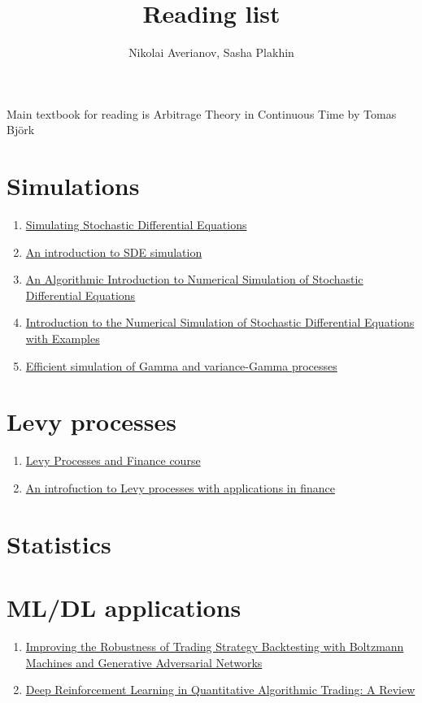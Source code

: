 \documentclass[a4paper, 12pt]{article}
\author{Nikolai Averianov, Sasha Plakhin}
\title{Reading list}
\begin{document}
\maketitle

Main textbook for reading is 
Arbitrage Theory in Continuous Time by Tomas Björk
\section*{Simulations}
\begin{enumerate}
	\item \href{http://www.columbia.edu/~mh2078/MonteCarlo/MCS_SDEs.pdf}{Simulating Stochastic Differential Equations}
	
	\item \href{https://arxiv.org/pdf/1004.0646.pdf}{An introduction to SDE simulation}
	
	\item \href{https://epubs.siam.org/doi/pdf/10.1137/S0036144500378302}{An Algorithmic Introduction to Numerical Simulation of Stochastic Differential Equations}
	
	\item \href{http://www.cs.fsu.edu/~mascagni/Petersen_SDE.pdf}{Introduction to the Numerical Simulation of Stochastic Differential Equations with Examples}
	
	\item \href{https://www.researchgate.net/publication/4053873_Efficient_simulation_of_Gamma_and_variance-Gamma_processes}{Efficient simulation of Gamma and variance-Gamma processes}
\end{enumerate}

\section*{Levy processes}
\begin{enumerate}
	\item \href{https://www.stats.ox.ac.uk/~winkel/ms3b10.pdf}{Levy Processes and Finance course}
	
	\item \href{https://arxiv.org/pdf/0804.0482.pdf}{An introfuction to Levy processes with applications in finance}
\end{enumerate}

\section*{Statistics}

\section*{ML/DL applications}
\begin{enumerate}
\item \href{http://thierry-roncalli.com/download/rbm_gan_backtesting.pdf}{Improving the Robustness of Trading Strategy Backtesting with Boltzmann Machines and Generative Adversarial Networks}

\item \href{https://arxiv.org/pdf/2106.00123.pdf}{Deep Reinforcement Learning in Quantitative Algorithmic Trading: A Review}
\end{enumerate}
\end{document}
